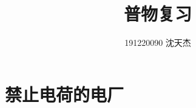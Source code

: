\documentclass{article}
\title{普物复习}
\author{191220090 沈天杰}
\begin{document}
    \maketitle
    \section{禁止电荷的电厂}
\end{document}

